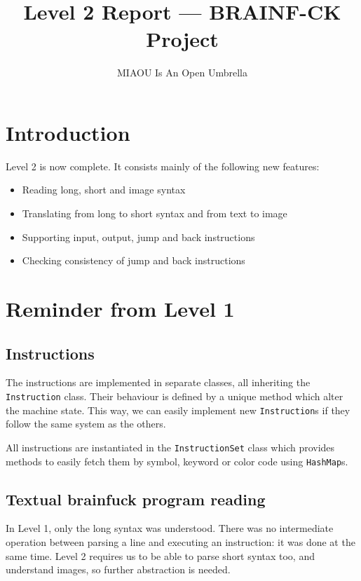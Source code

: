 \documentclass{article}
\author{MIAOU Is An Open Umbrella}
\title{\vspace{-1cm}Level 2 Report --- BRAINF-CK Project}
\begin{document}
\maketitle



\section{Introduction}

Level 2 is now complete. It consists mainly of the following new features:
\begin{itemize}
  \item Reading long, short and image syntax 
  \item Translating from long to short syntax and from text to image
  \item Supporting input, output, jump and back instructions
  \item Checking consistency of jump and back instructions
\end{itemize}

\section{Reminder from Level 1}

\subsection{Instructions}
The instructions are implemented in separate classes, all inheriting the \texttt{Instruction} class. Their behaviour is defined by a unique method which alter the machine state. This way, we can easily implement new \texttt{Instruction}s if they follow the same system as the others.

All instructions are instantiated in the \texttt{InstructionSet} class which provides methods to easily fetch them by symbol, keyword or color code using \texttt{HashMap}s.

\subsection{Textual brainfuck program reading}

In Level 1, only the long syntax was understood. There was no intermediate operation between parsing a line and executing an instruction: it was done at the same time. Level 2 requires us to be able to parse short syntax too, and understand images, so further abstraction is needed.
\end{document}
